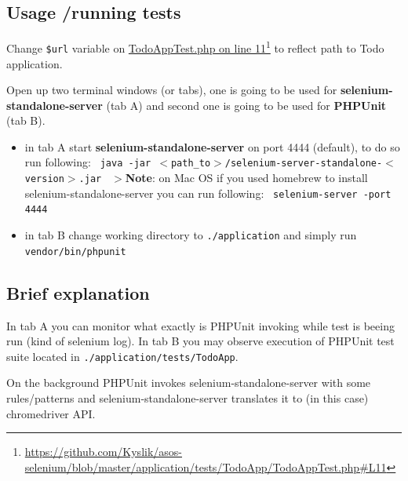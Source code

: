 \subsection{Usage \slash  running tests}
\label{usagerunningtests}

Change \texttt{\$url} variable on \href{https://github.com/Kyslik/asos-selenium/blob/master/application/tests/TodoApp/TodoAppTest.php#L11}{TodoAppTest.php on line 11}\footnote{\href{https://github.com/Kyslik/asos-selenium/blob/master/application/tests/TodoApp/TodoAppTest.php\#L11}{https:/\slash github.com\slash Kyslik\slash asos-selenium\slash blob\slash master\slash application\slash tests\slash TodoApp\slash TodoAppTest.php\#L11}} to reflect path to Todo application.

Open up two terminal windows (or tabs), one is going to be used for \textbf{selenium-standalone-server} (tab A) and second one is going to be used for \textbf{PHPUnit} (tab B). 

\begin{itemize}
\item in tab A start \textbf{selenium-standalone-server} on port 4444 (default), to do so run following:
 \texttt{
 java -jar $<$path\_to$>$\slash selenium-server-standalone-$<$version$>$.jar
}
 $>$\textbf{Note}: on Mac OS if you used homebrew to install selenium-standalone-server you can run following:
 \texttt{
 selenium-server -port 4444
}
\item in tab B change working directory to \texttt{.\slash application} and simply run \texttt{vendor\slash bin\slash phpunit}
\end{itemize}

\subsection{Brief explanation}
\label{briefexplanation}

In tab A you can monitor what exactly is PHPUnit invoking while test is beeing run (kind of selenium log).
In tab B you may observe execution of PHPUnit test suite located in \texttt{.\slash application\slash tests\slash TodoApp}. 

On the background PHPUnit invokes selenium-standalone-server with some rules\slash patterns and selenium-standalone-server translates it to (in this case) chromedriver API.